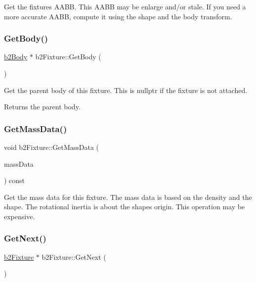 Get the fixture\textquotesingle{}s A\+A\+BB. This A\+A\+BB may be enlarge and/or stale. If you need a more accurate A\+A\+BB, compute it using the shape and the body transform. \mbox{\label{classb2_fixture_a9d6536ef274d768e86ab0a8330921535}} 
\subsubsection{\texorpdfstring{Get\+Body()}{GetBody()}}
{\footnotesize\ttfamily \hyperlink{classb2_body}{b2\+Body} $\ast$ b2\+Fixture\+::\+Get\+Body (\begin{DoxyParamCaption}{ }\end{DoxyParamCaption})\hspace{0.3cm}{\ttfamily [inline]}}

Get the parent body of this fixture. This is nullptr if the fixture is not attached. \begin{DoxyReturn}{Returns}
the parent body. 
\end{DoxyReturn}
\mbox{\label{classb2_fixture_a4532a12e848c5ceb5a3b94cf45b7cbad}} 
\subsubsection{\texorpdfstring{Get\+Mass\+Data()}{GetMassData()}}
{\footnotesize\ttfamily void b2\+Fixture\+::\+Get\+Mass\+Data (\begin{DoxyParamCaption}\item[{\hyperlink{structb2_mass_data}{b2\+Mass\+Data} $\ast$}]{mass\+Data }\end{DoxyParamCaption}) const\hspace{0.3cm}{\ttfamily [inline]}}

Get the mass data for this fixture. The mass data is based on the density and the shape. The rotational inertia is about the shape\textquotesingle{}s origin. This operation may be expensive. \mbox{\label{classb2_fixture_a0241952461f6f1a04a3c850306390fd2}} 
\subsubsection{\texorpdfstring{Get\+Next()}{GetNext()}}
{\footnotesize\ttfamily \hyperlink{classb2_fixture}{b2\+Fixture} $\ast$ b2\+Fixture\+::\+Get\+Next (\begin{DoxyParamCaption}{ }\end{DoxyParamCaption})\hspace{0.3cm}{\ttfamily [inline]}}

